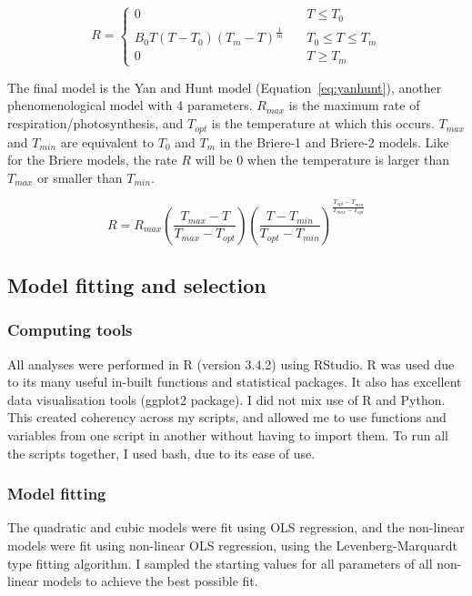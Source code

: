 \documentclass[11pt, a4paper]{article}
\begin{document}
	\begin{equation} \label{eq:briere2}
	R = \left\{
			\begin{array}{ll}
			0 & \quad T \leq T_0 \\
            B_0 T (T-T_0) (T_m-T)^\frac{1}{m} & \quad T_0 \leq T \leq T_m \\
            0 & \quad T \geq T_m
			\end{array}
	\right.
	\end{equation}

	The final model is the Yan and Hunt model (Equation~\ref{eq:yanhunt}), another phenomenological model with 4 parameters. $R_{max}$ is the maximum rate of respiration/photosynthesis, and $T_{opt}$ is the temperature at which this occurs. $T_{max}$ and $T_{min}$ are equivalent to $T_0$ and $T_m$ in the Briere-1 and Briere-2 models. Like for the Briere models, the rate $R$ will be 0 when the temperature is larger than $T_{max}$ or smaller than $T_{min}$.
	
	\begin{equation} \label{eq:yanhunt}
	R = R_{max} 
		\left(
			\frac{T_{max} - T}{T_{max} - T_{opt}}
		\right) 
		\left(
			\frac{T - T_{min}}{T_{opt} - T_{min}}
		\right)
			^\frac{T_{opt} - T_{min}}{T_{max} - T_{opt}}
	\end{equation}

	\subsection{Model fitting and selection}
	\subsubsection*{Computing tools}
	All analyses were performed in R (version 3.4.2) using RStudio. R was used due to its many useful in-built functions and statistical packages. It also has excellent data visualisation tools (ggplot2 package). I did not mix use of R and Python. This created coherency across my scripts, and allowed me to use functions and variables from one script in another without having to import them. To run all the scripts together, I used bash, due to its ease of use.
	
	\subsubsection*{Model fitting}
	The quadratic and cubic models were fit using OLS regression, and the non-linear models were fit using non-linear OLS regression, using the Levenberg-Marquardt type fitting algorithm. I sampled the starting values for all parameters of all non-linear models to achieve the best possible fit.
	
\end{document}
